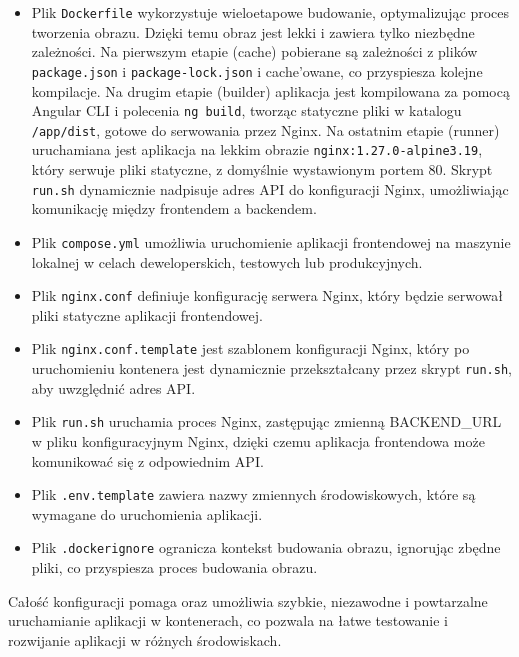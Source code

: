 \documentclass[../../main.tex]{subfiles}
\begin{document}
    \begin{itemize}
        \item Plik \texttt{Dockerfile} wykorzystuje wieloetapowe budowanie, optymalizując proces tworzenia obrazu. Dzięki temu obraz jest lekki i zawiera tylko niezbędne zależności.
        Na pierwszym etapie (cache) pobierane są zależności z plików \texttt{package.json} i \texttt{package-lock.json} i cache’owane, co przyspiesza kolejne kompilacje.
        Na drugim etapie (builder) aplikacja jest kompilowana za pomocą Angular CLI i polecenia \texttt{ng build}, tworząc statyczne pliki w katalogu \texttt{/app/dist}, gotowe do serwowania przez Nginx.
        Na ostatnim etapie (runner) uruchamiana jest aplikacja na lekkim obrazie \texttt{nginx:1.27.0-alpine3.19}, który serwuje pliki statyczne, z domyślnie wystawionym portem 80. Skrypt \texttt{run.sh} dynamicznie nadpisuje adres API do konfiguracji Nginx, umożliwiając komunikację między frontendem a backendem.
        \item Plik \texttt{compose.yml} umożliwia uruchomienie aplikacji frontendowej na maszynie lokalnej w celach deweloperskich, testowych lub produkcyjnych.
        \item Plik \texttt{nginx.conf} definiuje konfigurację serwera Nginx, który będzie serwował pliki statyczne aplikacji frontendowej.
        \item Plik \texttt{nginx.conf.template} jest szablonem konfiguracji Nginx, który po uruchomieniu kontenera jest dynamicznie przekształcany przez skrypt \texttt{run.sh}, aby uwzględnić adres API.
        \item Plik \texttt{run.sh} uruchamia proces Nginx, zastępując zmienną BACKEND_URL w pliku konfiguracyjnym Nginx, dzięki czemu aplikacja frontendowa może komunikować się z odpowiednim API.
        \item Plik \texttt{.env.template} zawiera nazwy zmiennych środowiskowych, które są wymagane do uruchomienia aplikacji.
        \item Plik \texttt{.dockerignore} ogranicza kontekst budowania obrazu, ignorując zbędne pliki, co przyspiesza proces budowania obrazu.
    \end{itemize}
    Całość konfiguracji pomaga oraz umożliwia szybkie, niezawodne i powtarzalne uruchamianie aplikacji w kontenerach, co pozwala na łatwe testowanie i rozwijanie aplikacji w różnych środowiskach.
\end{document}

